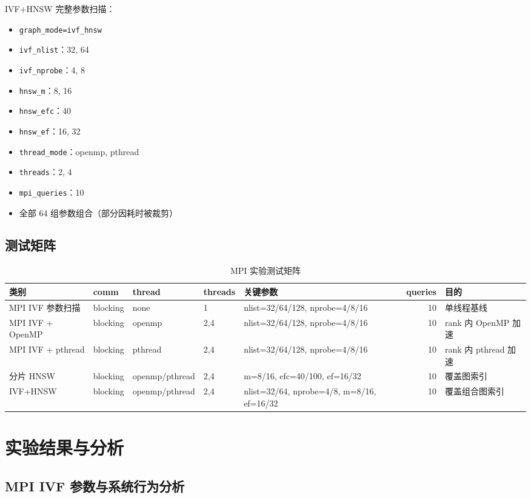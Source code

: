 \documentclass[a4paper]{article}
\begin{document}
IVF+HNSW 完整参数扫描：
\begin{itemize}
    \item \texttt{graph\_mode=ivf\_hnsw}
    \item \texttt{ivf\_nlist}：32, 64
    \item \texttt{ivf\_nprobe}：4, 8
    \item \texttt{hnsw\_m}：8, 16
    \item \texttt{hnsw\_efc}：40
    \item \texttt{hnsw\_ef}：16, 32
    \item \texttt{thread\_mode}：openmp, pthread
    \item \texttt{threads}：2, 4
    \item \texttt{mpi\_queries}：10
    \item 全部 64 组参数组合（部分因耗时被裁剪）
\end{itemize}

\subsection{测试矩阵}

\begin{table}[H]
\centering
\small
\begin{tabular}{lllllrp{4.5cm}}
\toprule
类别 & comm & thread & threads & 关键参数 & queries & 目的 \\
\midrule
MPI IVF 参数扫描 & blocking & none & 1 & nlist=32/64/128, nprobe=4/8/16 & 10 & 单线程基线 \\
MPI IVF + OpenMP & blocking & openmp & 2,4 & nlist=32/64/128, nprobe=4/8/16 & 10 & rank 内 OpenMP 加速 \\
MPI IVF + pthread & blocking & pthread & 2,4 & nlist=32/64/128, nprobe=4/8/16 & 10 & rank 内 pthread 加速 \\
分片 HNSW & blocking & openmp/pthread & 2,4 & m=8/16, efc=40/100, ef=16/32 & 10 & 覆盖图索引 \\
IVF+HNSW & blocking & openmp/pthread & 2,4 & nlist=32/64, nprobe=4/8, m=8/16, ef=16/32 & 10 & 覆盖组合图索引 \\
\bottomrule
\end{tabular}
\caption{MPI 实验测试矩阵}
\end{table}

\section{实验结果与分析}


\subsection{MPI IVF 参数与系统行为分析}
\end{document}
